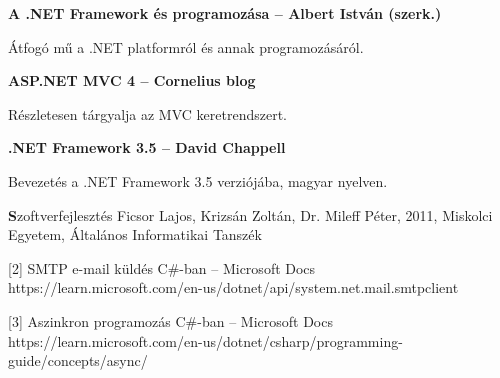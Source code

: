 \textbf{A .NET Framework és programozása – Albert István (szerk.)}

Átfogó mű a .NET platformról és annak programozásáról.


\textbf{ASP.NET MVC 4 – Cornelius blog}

Részletesen tárgyalja az MVC keretrendszert. 


 \textbf{.NET Framework 3.5 – David Chappell}

Bevezetés a .NET Framework 3.5 verziójába, magyar nyelven.

\textbf Szoftverfejlesztés Ficsor Lajos, Krizsán Zoltán, Dr. Mileff Péter, 2011, Miskolci Egyetem, Általános Informatikai Tanszék 

[2] SMTP e-mail küldés C#-ban – Microsoft Docs
https://learn.microsoft.com/en-us/dotnet/api/system.net.mail.smtpclient

[3] Aszinkron programozás C#-ban – Microsoft Docs
https://learn.microsoft.com/en-us/dotnet/csharp/programming-guide/concepts/async/